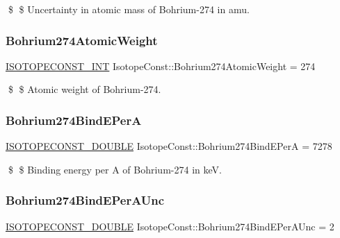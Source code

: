 \$ \$ Uncertainty in atomic mass of Bohrium-\/274 in amu. \mbox{\label{group___isotope_const-_bohrium-_bh274_ga597645e36663da9833b3b1d3a6036f75}} 
\subsubsection{\texorpdfstring{Bohrium274\+Atomic\+Weight}{Bohrium274AtomicWeight}}
{\footnotesize\ttfamily \mbox{\hyperlink{group___isotope_const-_macros_ga5f18360b3e99483a35c32d789e62621c}{I\+S\+O\+T\+O\+P\+E\+C\+O\+N\+S\+T\+\_\+\+I\+NT}} Isotope\+Const\+::\+Bohrium274\+Atomic\+Weight = 274}

\$ \$ Atomic weight of Bohrium-\/274. \mbox{\label{group___isotope_const-_bohrium-_bh274_gae4b9549020d55c45a4a4342a728972a3}} 
\subsubsection{\texorpdfstring{Bohrium274\+Bind\+E\+PerA}{Bohrium274BindEPerA}}
{\footnotesize\ttfamily \mbox{\hyperlink{group___isotope_const-_macros_ga8f45a7272ce02c0b4c65c44636ed719a}{I\+S\+O\+T\+O\+P\+E\+C\+O\+N\+S\+T\+\_\+\+D\+O\+U\+B\+LE}} Isotope\+Const\+::\+Bohrium274\+Bind\+E\+PerA = 7278}

\$ \$ Binding energy per A of Bohrium-\/274 in keV. \mbox{\label{group___isotope_const-_bohrium-_bh274_ga250575cee093642d9efc6ac2d885040f}} 
\subsubsection{\texorpdfstring{Bohrium274\+Bind\+E\+Per\+A\+Unc}{Bohrium274BindEPerAUnc}}
{\footnotesize\ttfamily \mbox{\hyperlink{group___isotope_const-_macros_ga8f45a7272ce02c0b4c65c44636ed719a}{I\+S\+O\+T\+O\+P\+E\+C\+O\+N\+S\+T\+\_\+\+D\+O\+U\+B\+LE}} Isotope\+Const\+::\+Bohrium274\+Bind\+E\+Per\+A\+Unc = 2}

